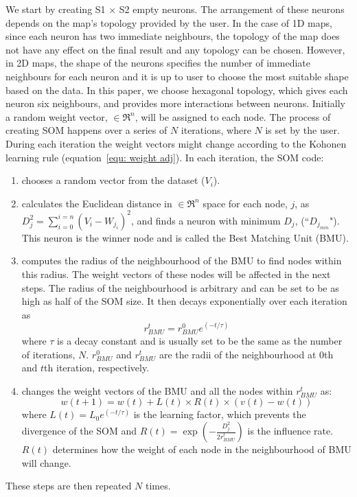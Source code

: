      We start by creating S1 $\times$ S2 empty neurons. 
     The arrangement of these neurons depends on the map's topology provided by the user. 
     In the case of 1D maps, since each neuron has two immediate neighbours, the topology of the map does not have any effect on the final result and any topology can be chosen.
     However, in 2D maps, the shape of the neurons specifies the number of immediate neighbours for each neuron and it is up to user to choose the most suitable shape based on the data.
     In this paper, we choose hexagonal topology, which gives each neuron six neighbours, and provides more interactions between neurons.
     Initially a random weight vector,  $\in \Re^n$, will be assigned to each node.
     The process of creating SOM happens over a series of $N$ iterations, where $N$ is set by the user. 
     During each iteration the weight vectors might change according to the Kohonen learning rule (equation~\ref{equ: weight adj}). 
      In each iteration, the SOM code:
     \begin{enumerate}
        \item chooses a random vector from the dataset ($V_i$).
        \item calculates the Euclidean distance in $\in \Re^n$ space for each node, $j$, as  $D_j^2= \sum_{i=0}^{i=n} (V_i - W_{j_i})^2$, and finds a neuron with minimum $D_j$, (``$D_{j_{min}}$"). This neuron is the winner node and is called the Best Matching Unit (BMU). 
        \item  computes the radius of the neighbourhood of the BMU to find nodes within this radius. The weight vectors of these nodes will be affected in the next steps. The radius of the neighbourhood is arbitrary and can be set to be as high as half of the SOM size. It then decays exponentially over each iteration as
        \begin{equation}
            r^t_{BMU} = r^0_{BMU}e^{(-t/\tau)}
        \end{equation}
        where $\tau$ is a decay constant and is usually set to be the same as the number of iterations, $N$. $r^0_{BMU}$ and $r^t_{BMU}$ are the radii of the neighbourhood at 0th and $t$th iteration, respectively. 
        \item changes the weight vectors of the BMU and all the nodes within $r^t_{BMU}$ as:
        \begin{equation}
            \label{equ: weight adj}
            w(t+1)=w(t)+L(t) \times R(t) \times(v(t)-w(t))
        \end{equation}
        where $L(t) = L_0 e^{(-t/\tau)}$ is the learning factor, which prevents the divergence of the SOM and $R(t)=\exp(-\frac{D_j^2}{2r^t_{BMU}})$ is the influence rate. $R(t)$ determines how the weight of each node in the neighbourhood of BMU will change.
     \end{enumerate}
     These steps are then repeated $N$ times.
     
